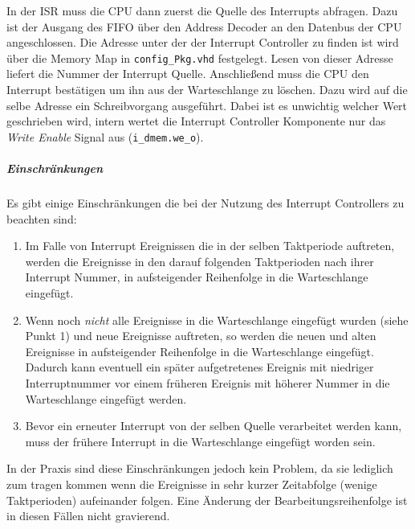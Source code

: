 In der \gls{ISR} muss die CPU dann zuerst die Quelle des Interrupts abfragen. Dazu ist der Ausgang des FIFO über den Address Decoder an den Datenbus der CPU angeschlossen. Die Adresse unter der der Interrupt Controller zu finden ist wird über die Memory Map in \lstinline$config_Pkg.vhd$ festgelegt. Lesen von dieser Adresse liefert die Nummer der Interrupt Quelle. Anschließend muss die CPU den Interrupt bestätigen um ihn aus der Warteschlange zu löschen. Dazu wird auf die selbe Adresse ein Schreibvorgang ausgeführt. Dabei ist es unwichtig welcher Wert geschrieben wird, intern wertet die Interrupt Controller Komponente nur das \emph{Write Enable} Signal aus (\lstinline$i_dmem.we_o$).

\subparagraph{Einschränkungen} Es gibt einige Einschränkungen die bei der Nutzung des Interrupt Controllers zu beachten sind:
\begin{enumerate}
    \item Im Falle von Interrupt Ereignissen die in der selben Taktperiode auftreten, werden die Ereignisse in den darauf folgenden Taktperioden nach ihrer Interrupt Nummer, in aufsteigender Reihenfolge in die Warteschlange eingefügt.
    \item Wenn noch \emph{nicht} alle Ereignisse in die Warteschlange eingefügt wurden (siehe Punkt 1) und neue Ereignisse auftreten, so werden die neuen und alten Ereignisse in aufsteigender Reihenfolge in die Warteschlange eingefügt. Dadurch kann eventuell ein später aufgetretenes Ereignis mit niedriger Interruptnummer vor einem früheren Ereignis mit höherer Nummer in die Warteschlange eingefügt werden.
    \item Bevor ein erneuter Interrupt von der selben Quelle verarbeitet werden kann, muss der frühere Interrupt in die Warteschlange eingefügt worden sein.
\end{enumerate}

In der Praxis sind diese Einschränkungen jedoch kein Problem, da sie lediglich zum tragen kommen wenn die Ereignisse in sehr kurzer Zeitabfolge (wenige Taktperioden) aufeinander folgen. Eine Änderung der Bearbeitungsreihenfolge ist in diesen Fällen nicht gravierend.


